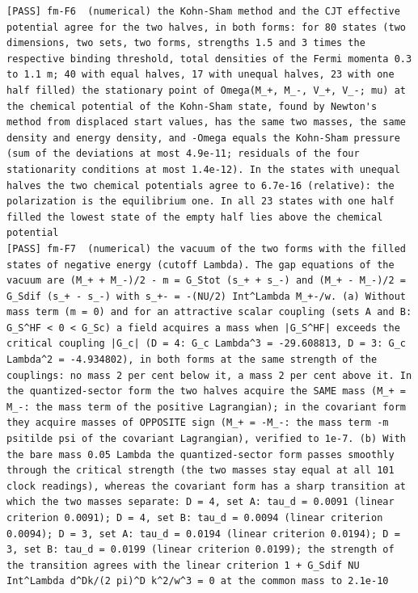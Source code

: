 \documentclass[
  10pt,
]{article}
\begin{document}
\begin{verbatim}
[PASS] fm-F6  (numerical) the Kohn-Sham method and the CJT effective potential agree for the two halves, in both forms: for 80 states (two dimensions, two sets, two forms, strengths 1.5 and 3 times the respective binding threshold, total densities of the Fermi momenta 0.3 to 1.1 m; 40 with equal halves, 17 with unequal halves, 23 with one half filled) the stationary point of Omega(M_+, M_-, V_+, V_-; mu) at the chemical potential of the Kohn-Sham state, found by Newton's method from displaced start values, has the same two masses, the same density and energy density, and -Omega equals the Kohn-Sham pressure (sum of the deviations at most 4.9e-11; residuals of the four stationarity conditions at most 1.4e-12). In the states with unequal halves the two chemical potentials agree to 6.7e-16 (relative): the polarization is the equilibrium one. In all 23 states with one half filled the lowest state of the empty half lies above the chemical potential
[PASS] fm-F7  (numerical) the vacuum of the two forms with the filled states of negative energy (cutoff Lambda). The gap equations of the vacuum are (M_+ + M_-)/2 - m = G_Stot (s_+ + s_-) and (M_+ - M_-)/2 = G_Sdif (s_+ - s_-) with s_+- = -(NU/2) Int^Lambda M_+-/w. (a) Without mass term (m = 0) and for an attractive scalar coupling (sets A and B: G_S^HF < 0 < G_Sc) a field acquires a mass when |G_S^HF| exceeds the critical coupling |G_c| (D = 4: G_c Lambda^3 = -29.608813, D = 3: G_c Lambda^2 = -4.934802), in both forms at the same strength of the couplings: no mass 2 per cent below it, a mass 2 per cent above it. In the quantized-sector form the two halves acquire the SAME mass (M_+ = M_-: the mass term of the positive Lagrangian); in the covariant form they acquire masses of OPPOSITE sign (M_+ = -M_-: the mass term -m psitilde psi of the covariant Lagrangian), verified to 1e-7. (b) With the bare mass 0.05 Lambda the quantized-sector form passes smoothly through the critical strength (the two masses stay equal at all 101 clock readings), whereas the covariant form has a sharp transition at which the two masses separate: D = 4, set A: tau_d = 0.0091 (linear criterion 0.0091); D = 4, set B: tau_d = 0.0094 (linear criterion 0.0094); D = 3, set A: tau_d = 0.0194 (linear criterion 0.0194); D = 3, set B: tau_d = 0.0199 (linear criterion 0.0199); the strength of the transition agrees with the linear criterion 1 + G_Sdif NU Int^Lambda d^Dk/(2 pi)^D k^2/w^3 = 0 at the common mass to 2.1e-10

\end{verbatim}
\end{document}
